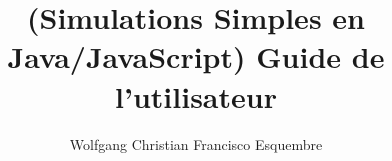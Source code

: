 \documentclass[10pt,final]{flwide10}
\begin{document}
  \frontmatter
  \title{\center \Ejs \linebreak 
    {\Large(Simulations Simples en Java/JavaScript)} \linebreak\linebreak
    Guide de l'utilisateur}


  \author{\center Wolfgang Christian  \linebreak Francisco Esquembre}

    \maketitle

  \frontmatter

  \mainmatter
 
 

    \appendix

  \backmatter
    
    

\end{document}
